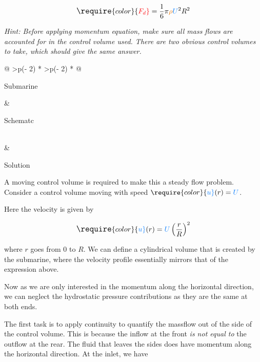 \documentclass[
  1.2em,
  letterpaper,
  DIV=11,
  numbers=noendperiod]{scrartcl}
\begin{document}
\[
\large
\require{color}{\color[rgb]{0.986252,0.007236,0.027423}F_{d}} = \frac{1}{6} \pi {\color[rgb]{0.918231,0.469102,0.038229}\rho }{\color[rgb]{0.059472,0.501943,0.998465}U}^2 R^2 
\]

\emph{Hint: Before applying momentum equation, make sure all mass flows
are accounted for in the control volume used. There are two obvious
control volumes to take, which should give the same answer.}

\begin{longtable}[]{@{}
  >{\centering\arraybackslash}p{(\columnwidth - 2\tabcolsep) * }
  >{\centering\arraybackslash}p{(\columnwidth - 2\tabcolsep) * }@{}}
\toprule\noalign{}
\begin{minipage}[b]{\linewidth}\centering
Submarine
\end{minipage} & \begin{minipage}[b]{\linewidth}\centering
Schematc
\end{minipage} \\
\midrule\noalign{}
\endhead
\bottomrule\noalign{}
\endlastfoot
& \\
\end{longtable}

Solution

A moving control volume is required to make this a steady flow problem.
Consider a control volume moving with speed
\(\require{color}{\color[rgb]{0.059472,0.501943,0.998465}u}(r)={\color[rgb]{0.059472,0.501943,0.998465}U}\).

Here the velocity is given by

\[
\large
\require{color}{\color[rgb]{0.059472,0.501943,0.998465}u}(r)={\color[rgb]{0.059472,0.501943,0.998465}U } \left( \frac{r}{R} \right)^2 
\]

where \(r\) goes from \(0\) to \(R\). We can define a cylindrical volume
that is created by the submarine, where the velocity profile essentially
mirrors that of the expression above.

Now as we are only interested in the momentum along the horizontal
direction, we can neglect the hydrostatic pressure contributions as they
are the same at both ends.

The first task is to apply continuity to quantify the massflow out of
the side of the control volume. This is because the inflow at the front
\emph{is not equal to} the outflow at the rear. The fluid that leaves
the sides does have momentum along the horizontal direction. At the
inlet, we have
\end{document}
